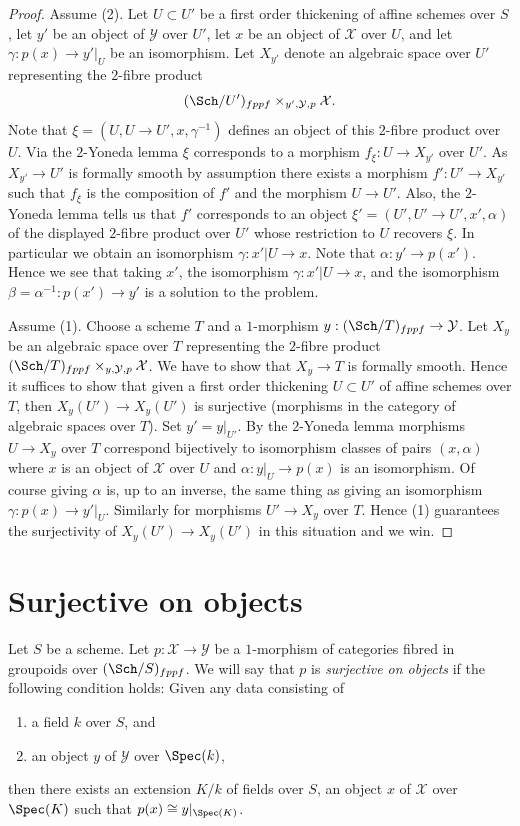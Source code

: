 \begin{proof}
Assume (2). Let $U \subset U'$ be a first order thickening
of affine schemes over $S$, let $y'$ be an object of $\mathcal{Y}$
over $U'$, let $x$ be an object of $\mathcal{X}$ over $U$,
and let $\gamma : p(x) \to y'|_U$ be an isomorphism. Let
$X_{y'}$ denote an algebraic space over $U'$ representing the $2$-fibre
product
$$
(\Sch/U')_{fppf} \times_{y', \mathcal{Y}, p} \mathcal{X}.
$$
Note that $\xi = (U, U \to U', x, \gamma^{-1})$ defines an object of
this $2$-fibre product over $U$. Via the $2$-Yoneda lemma $\xi$ corresponds
to a morphism $f_\xi : U \to X_{y'}$ over $U'$. As $X_{y'} \to U'$ is
formally smooth by assumption there exists a morphism
$f' : U' \to X_{y'}$ such that $f_\xi$ is the composition of $f'$
and the morphism $U \to U'$. Also, the $2$-Yoneda lemma tells us that
$f'$ corresponds to an object $\xi' = (U', U' \to U', x', \alpha)$ of
the displayed $2$-fibre product over $U'$ whose restriction to
$U$ recovers $\xi$. In particular we obtain an isomorphism
$\gamma : x'|U \to x$. Note that $\alpha : y' \to p(x')$.
Hence we see that taking $x'$, the isomorphism
$\gamma : x'|U \to x$, and the isomorphism
$\beta = \alpha^{-1} : p(x') \to y'$
is a solution to the problem.

\medskip\noindent
Assume (1). Choose a scheme $T$ and a $1$-morphism
$y : (\Sch/T)_{fppf} \to \mathcal{Y}$. Let
$X_y$ be an algebraic space over $T$ representing the $2$-fibre product
$(\Sch/T)_{fppf} \times_{y, \mathcal{Y}, p} \mathcal{X}$.
We have to show that $X_y \to T$ is formally smooth.
Hence it suffices to show that given a first order thickening
$U \subset U'$ of affine schemes over $T$, then
$X_y(U') \to X_y(U')$ is surjective (morphisms in the
category of algebraic spaces over $T$). Set $y' = y|_{U'}$.
By the $2$-Yoneda lemma morphisms $U \to X_y$ over $T$ correspond bijectively
to isomorphism classes of pairs $(x, \alpha)$ where $x$ is an object
of $\mathcal{X}$ over $U$ and $\alpha : y|_U \to p(x)$ is an isomorphism.
Of course giving $\alpha$ is, up to an inverse, the same thing as giving
an isomorphism $\gamma : p(x) \to y'|_U$.
Similarly for morphisms $U' \to X_y$ over $T$. Hence (1) guarantees
the surjectivity of $X_y(U') \to X_y(U')$
in this situation and we win.
\end{proof}

\section{Surjective on objects}
\label{criteria-section-formally-surjective}
Let $S$ be a scheme. Let $p : \mathcal{X} \to \mathcal{Y}$ be a $1$-morphism
of categories fibred in groupoids over $(\Sch/S)_{fppf}$. We will say that
$p$ is {\it surjective on objects} if the following condition holds:
Given any data consisting of
\begin{enumerate}
\item a field $k$ over $S$, and
\item an object $y$ of $\mathcal{Y}$ over $\Spec(k)$,
\end{enumerate}
then there exists an extension $K/k$ of fields over $S$, an
object $x$ of $\mathcal{X}$ over $\Spec(K)$
such that $p(x) \cong y|_{\Spec(K)}$.

